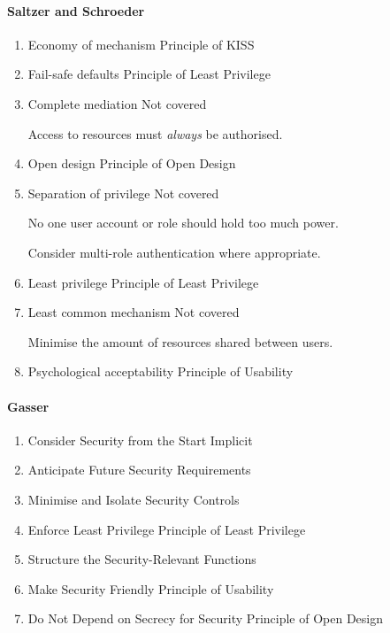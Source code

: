 \paragraph{Saltzer and Schroeder}
\begin{enumerate}
    \item Economy of mechanism \dotfill Principle of KISS
    \item Fail-safe defaults \dotfill Principle of Least Privilege
    \item Complete mediation \dotfill Not covered
    
    \hspace{0.5em} Access to resources must \textsl{always} be authorised.

    \item Open design \dotfill Principle of Open Design
    \item Separation of privilege \dotfill Not covered
    
    \hspace{0.5em} No one user account or role should hold too much power.

    \hspace{0.5em} Consider multi-role authentication where appropriate.

    \item Least privilege \dotfill Principle of Least Privilege
    \item Least common mechanism \dotfill Not covered
    
    \hspace{0.5em} Minimise the amount of resources shared between users.

    \item Psychological acceptability \dotfill Principle of Usability
\end{enumerate}

\paragraph{Gasser}
\begin{enumerate}
    \item Consider Security from the Start \dotfill Implicit
    \item Anticipate Future Security Requirements
    \item Minimise and Isolate Security Controls
    \item Enforce Least Privilege \dotfill Principle of Least Privilege
    \item Structure the Security-Relevant Functions
    \item Make Security Friendly \dotfill Principle of Usability
    \item Do Not Depend on Secrecy for Security \dotfill Principle of Open Design
\end{enumerate}

